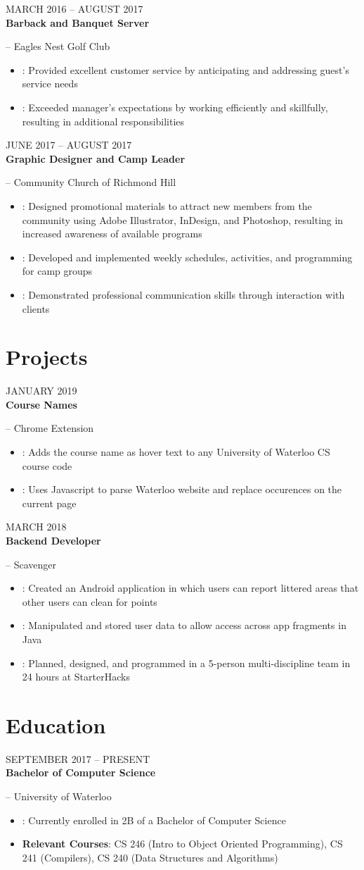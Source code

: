 \documentclass[letterpaper, 11pt]{article}
\newcommand{\styleDate}[1]{
    {{\color{resGray}\MakeTextUppercase{#1}}}
}
\newcommand{\styleDescription}[1]{
    {\color{resGray}#1}
}
\newcommand{\styleEmployer}[1]{
    {\Large{\color{resGray}#1}}
}
\newcommand{\stylePosition}[1]{
    {\Large{\textbf{\color{resBlue}#1}}}
}
\newcommand{\resBulletPoint}[2][]{
    \item\styleDescription{
        \ifthenelse
            {\isempty{#1}}
            {}
            {\textbf{#1}: }
        #2
    }
}
\newcommand{\resItem}[3]{
    \vspace{6pt}
    \styleDate{#3} \\
    \stylePosition{#1}\styleEmployer{-- #2}
}
\newenvironment{resElement}[1][]{
    #1
    \begin{itemize}[leftmargin=2ex, nosep, noitemsep]
}{
    \end{itemize}
}
\begin{document}
    \begin{resElement}[
        \resItem
        {Barback and Banquet Server}
        {Eagles Nest Golf Club}
        {March 2016 -- August 2017}
    ]
        \resBulletPoint{Provided excellent customer service by anticipating and addressing guest's service needs}
        \resBulletPoint{Exceeded manager's expectations by working efficiently and skillfully, resulting in additional responsibilities}
    \end{resElement}

    \begin{resElement}[
        \resItem
        {Graphic Designer and Camp Leader}
        {Community Church of Richmond Hill}
        {June 2017 -- August 2017}
    ]
        \resBulletPoint{Designed promotional materials to attract new members from the community using Adobe Illustrator, InDesign, and Photoshop, resulting in increased awareness of available programs}
        \resBulletPoint{Developed and implemented weekly schedules, activities, and programming for camp groups}
        \resBulletPoint{Demonstrated professional communication skills through interaction with clients}
    \end{resElement}

\section{Projects}
    \begin{resElement}[
        \resItem
        {Course Names}
        {Chrome Extension}
        {January 2019}
    ]
        \resBulletPoint{Adds the course name as hover text to any University of Waterloo CS course code}
        \resBulletPoint{Uses Javascript to parse Waterloo website and replace occurences on the current page}
    \end{resElement}

    \begin{resElement}[
        \resItem
        {Backend Developer}
        {Scavenger}
        {March 2018}
    ]
        \resBulletPoint{Created an Android application in which users can report littered areas that other users can clean for points}
        \resBulletPoint{Manipulated and stored user data to allow access across app fragments in Java}
        \resBulletPoint{Planned, designed, and programmed in a 5-person multi-discipline team in 24 hours at StarterHacks}
    \end{resElement}

\section{Education}
    \begin{resElement}[
        \resItem
        {Bachelor of Computer Science}
        {University of Waterloo}
        {September 2017 -- Present}
    ]
        \resBulletPoint{Currently enrolled in 2B of a Bachelor of Computer Science}
        \resBulletPoint[Relevant Courses]{CS 246 (Intro to Object Oriented Programming), CS 241 (Compilers), CS 240 (Data Structures and Algorithms)}
    \end{resElement}
\end{document}
